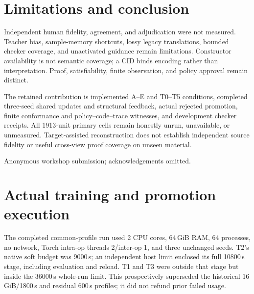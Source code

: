 \documentclass{article}
\begin{document}
\section{Limitations and conclusion}
Independent human fidelity, agreement, and adjudication were not measured. Teacher bias, sample-memory shortcuts, lossy legacy translations, bounded checker coverage, and unactivated guidance remain limitations. Constructor availability is not semantic coverage; a CID binds encoding rather than interpretation. Proof, satisfiability, finite observation, and policy approval remain distinct.

The retained contribution is implemented A--E and T0--T5 conditions, completed three-seed shared updates and structural feedback, actual rejected promotion, finite conformance and policy--code--trace witnesses, and development checker receipts. All 1913-unit primary cells remain honestly unrun, unavailable, or unmeasured. Target-assisted reconstruction does not establish independent source fidelity or useful cross-view proof coverage on unseen material.\label{af-main-text-end}

\begin{ack}
Anonymous workshop submission; acknowledgements omitted.
\end{ack}




\appendix

\section{Actual training and promotion execution}
\label{app:actual-execution}
The completed common-profile run used 2 CPU cores, 64\,GiB RAM, 64 processes, no network, Torch intra-op threads 2/inter-op 1, and three unchanged seeds. T2's native soft budget was 9000\,s; an independent host limit enclosed its full 10800\,s stage, including evaluation and reload. T1 and T3 were outside that stage but inside the 36000\,s whole-run limit. This prospectively superseded the historical 16\,GiB/1800\,s and residual 600\,s profiles; it did not refund prior failed usage.
\end{document}
